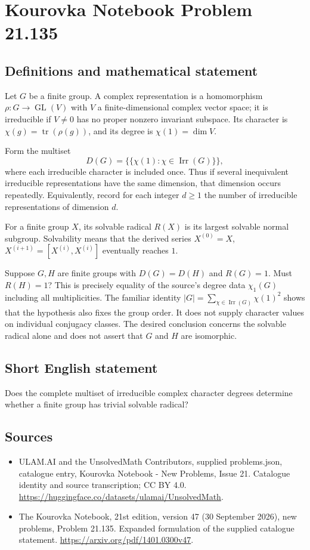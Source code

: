 \documentclass[11pt,a4paper]{article}
\begin{document}
\section*{Kourovka Notebook Problem 21.135}\label{statement}

\subsection{Definitions and mathematical statement}
Let $G$ be a finite group. A complex representation is a homomorphism $\rho:G\to\operatorname{GL}(V)$ with $V$ a finite-dimensional complex vector space; it is irreducible if $V\ne0$ has no proper nonzero invariant subspace. Its character is $\chi(g)=\operatorname{tr}(\rho(g))$, and its degree is $\chi(1)=\dim V$.

Form the multiset
\[
 D(G)=\{\!\{\chi(1):\chi\in\operatorname{Irr}(G)\}\!\},
\]
where each irreducible character is included once. Thus if several inequivalent irreducible representations have the same dimension, that dimension occurs repeatedly. Equivalently, record for each integer $d\ge1$ the number of irreducible representations of dimension $d$.

For a finite group $X$, its solvable radical $R(X)$ is its largest solvable normal subgroup. Solvability means that the derived series $X^{(0)}=X$, $X^{(i+1)}=[X^{(i)},X^{(i)}]$ eventually reaches $1$.

Suppose $G,H$ are finite groups with $D(G)=D(H)$ and $R(G)=1$. Must $R(H)=1$? This is precisely equality of the source's degree data $\chi_1(G)$ including all multiplicities. The familiar identity $|G|=\sum_{\chi\in\operatorname{Irr}(G)}\chi(1)^2$ shows that the hypothesis also fixes the group order. It does not supply character values on individual conjugacy classes. The desired conclusion concerns the solvable radical alone and does not assert that $G$ and $H$ are isomorphic.
\subsection{Short English statement}
Does the complete multiset of irreducible complex character degrees determine whether a finite group has trivial solvable radical?
\subsection{Sources}
\begin{itemize}
\item[S1] ULAM.AI and the UnsolvedMath Contributors, supplied problems.json, catalogue entry, Kourovka Notebook - New Problems, Issue 21. Catalogue identity and source transcription; CC BY 4.0.
\url{https://huggingface.co/datasets/ulamai/UnsolvedMath}.
\item[S2] The Kourovka Notebook, 21st edition, version 47 (30 September 2026), new problems, Problem 21.135. Expanded formulation of the supplied catalogue statement.
\url{https://arxiv.org/pdf/1401.0300v47}.
\end{itemize}
\end{document}
